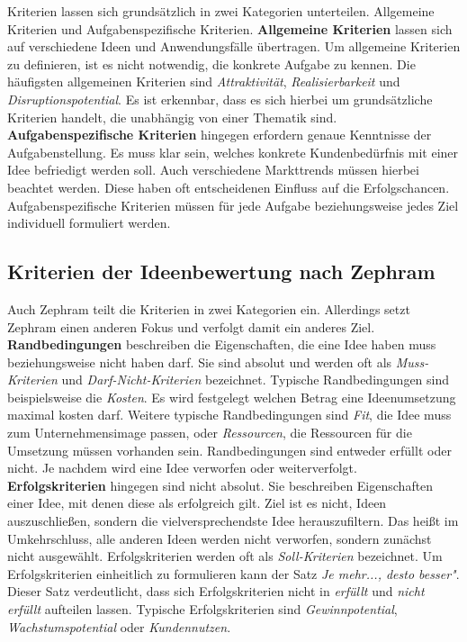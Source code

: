 Kriterien lassen sich grundsätzlich in zwei Kategorien unterteilen. Allgemeine Kriterien und Aufgabenspezifische Kriterien.
\textbf{Allgemeine Kriterien} lassen sich auf verschiedene Ideen und Anwendungsfälle übertragen.
Um allgemeine Kriterien zu definieren, ist es nicht notwendig, die konkrete Aufgabe zu kennen. 
Die häufigsten allgemeinen Kriterien sind \textit{Attraktivität}, \textit{Realisierbarkeit} und 
\textit{Disruptionspotential}. Es ist erkennbar, dass es sich hierbei um grundsätzliche Kriterien handelt, die unabhängig von einer Thematik sind.\\
\textbf{Aufgabenspezifische Kriterien} hingegen erfordern genaue Kenntnisse der Aufgabenstellung. Es muss klar sein, welches 
konkrete Kundenbedürfnis mit einer Idee befriedigt werden soll. Auch verschiedene Markttrends müssen hierbei beachtet werden. 
Diese haben oft entscheidenen Einfluss auf die Erfolgschancen. Aufgabenspezifische Kriterien müssen für jede Aufgabe beziehungsweise jedes Ziel 
individuell formuliert werden.

\subsection{Kriterien der Ideenbewertung nach Zephram}
Auch Zephram teilt die Kriterien in zwei Kategorien ein. Allerdings setzt Zephram einen anderen Fokus und verfolgt 
damit ein anderes Ziel.\\

\textbf{Randbedingungen} beschreiben die Eigenschaften, die eine Idee haben muss
beziehungsweise nicht haben darf. Sie sind absolut und werden oft als \textit{Muss-Kriterien}
und \textit{Darf-Nicht-Kriterien} bezeichnet.
Typische Randbedingungen sind beispielsweise die \textit{Kosten}. 
Es wird festgelegt welchen Betrag eine Ideenumsetzung maximal kosten darf. 
Weitere typische Randbedingungen sind \textit{Fit}, die Idee muss zum Unternehmensimage passen, oder \textit{Ressourcen}, die Ressourcen für die
Umsetzung müssen vorhanden sein. 
Randbedingungen sind entweder erfüllt oder nicht. Je nachdem wird eine Idee verworfen oder weiterverfolgt. \\

\textbf{Erfolgskriterien} hingegen sind nicht absolut. Sie beschreiben Eigenschaften einer Idee, 
mit denen diese als erfolgreich gilt. Ziel ist es nicht, Ideen auszuschließen, sondern die
vielversprechendste Idee herauszufiltern. Das heißt im Umkehrschluss, alle anderen Ideen werden nicht 
verworfen, sondern zunächst nicht ausgewählt. Erfolgskriterien werden oft als \textit{Soll-Kriterien} bezeichnet. Um 
Erfolgskriterien einheitlich zu formulieren kann der Satz \textit{Je mehr..., desto besser"}.
Dieser Satz verdeutlicht, dass sich Erfolgskriterien nicht in \textit{erfüllt} und \textit{nicht erfüllt} aufteilen 
lassen. Typische Erfolgskriterien sind \textit{Gewinnpotential}, \textit{Wachstumspotential} oder \textit{Kundennutzen}.\\

